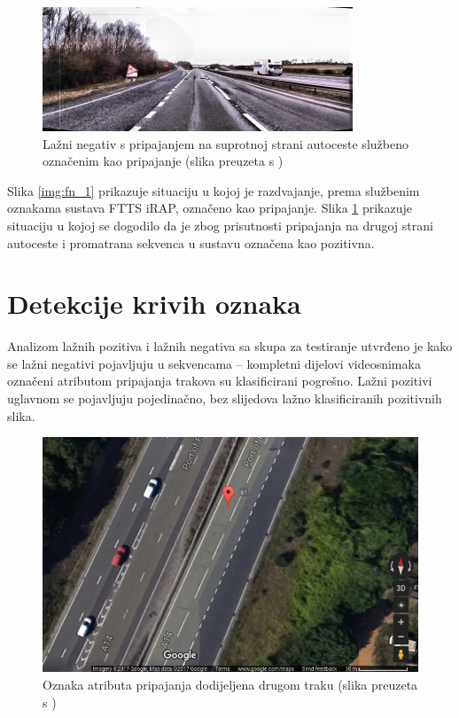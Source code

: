 \documentclass[times, utf8, diplomski, numeric]{fer}
\begin{document}
\begin{figure}[H]
\centering
\includegraphics[scale=1]{images/fn_2.png}
\caption{Lažni negativ s pripajanjem na suprotnoj strani autoceste službeno označenim kao pripajanje (slika preuzeta s \citep{url:ftts_irap})}
\label{img:fn_2}
\end{figure}

Slika \ref{img:fn_1} prikazuje situaciju u kojoj je razdvajanje, prema službenim oznakama sustava FTTS iRAP, označeno kao pripajanje. 
Slika \ref{img:fn_2} prikazuje situaciju u kojoj se dogodilo da je zbog prisutnosti pripajanja na drugoj strani autoceste i promatrana sekvenca u sustavu označena kao pozitivna.

\section{Detekcije krivih oznaka}
Analizom lažnih pozitiva i lažnih negativa sa skupa za testiranje utvrđeno je kako se lažni negativi pojavljuju u sekvencama -- kompletni dijelovi videosnimaka označeni atributom pripajanja trakova su klasificirani pogrešno.
Lažni pozitivi uglavnom se pojavljuju pojedinačno, bez slijedova lažno klasificiranih pozitivnih slika.

\begin{figure}[H]
\centering
\includegraphics[scale=0.5]{images/wrong_lane_label.png}
\caption{Oznaka atributa pripajanja dodijeljena drugom traku (slika preuzeta s \citep{url:google_maps})}
\label{img:wrong_lane_label}
\end{figure}
\end{document}
